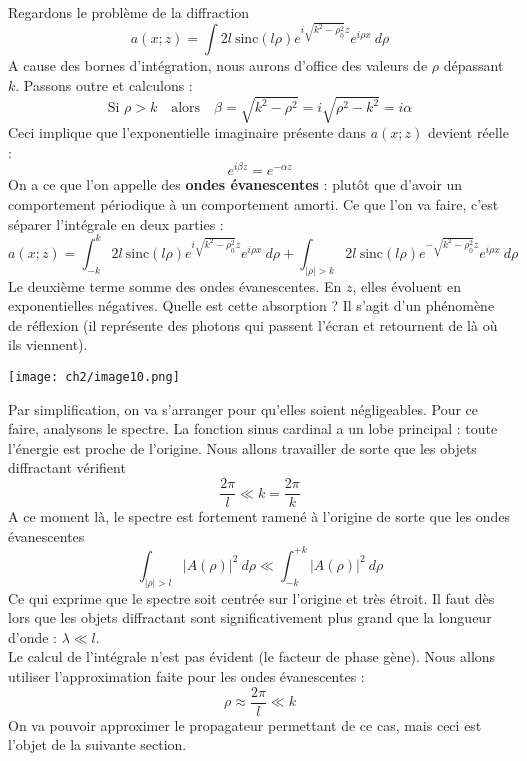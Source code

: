 \begin{enumerate}
Regardons le problème de la diffraction
\begin{equation}
a(x;z) = \int 2l\ \text{sinc}(l\rho)e^{i\sqrt{k^2-\rho_0^2}z}e^{i\rho x}\ d\rho
\end{equation}
A cause des bornes d'intégration, nous aurons d'office des valeurs de $\rho$ dépassant 
$k$. Passons outre et calculons :
\begin{equation}
\text{Si } \rho > k\quad \text{alors}\quad \beta = \sqrt{k^2-\rho^2} = i\sqrt{\rho^2-k^2} = 
i\alpha
\end{equation}
Ceci implique que l'exponentielle imaginaire présente dans $a(x;z)$ devient réelle :
\begin{equation}
e^{i\beta z} = e^{-\alpha z}
\end{equation}
On a ce que l'on appelle des \textbf{ondes évanescentes} : plutôt que d'avoir un comportement 
périodique à un comportement amorti. Ce que l'on va faire, c'est séparer l’intégrale en deux 
parties :
\begin{equation}
a(x;z) = \int_{-k}^k  2l\ \text{sinc}(l\rho)e^{i\sqrt{k^2-\rho_0^2}z}e^{i\rho x}\ d\rho + 
\int_{|\rho|>k}  2l\ \text{sinc}(l\rho)e^{-\sqrt{k^2-\rho_0^2}z}e^{i\rho x}\ d\rho
\end{equation}
Le deuxième terme somme des ondes évanescentes. En $z$, elles évoluent en exponentielles 
négatives. Quelle est cette absorption ? Il s'agit d'un phénomène de réflexion (il représente 
des photons qui passent l'écran et retournent de là où ils viennent). 

\begin{center}
\texttt{[image: ch2/image10.png]}
\end{center}
Par simplification, 
on va s'arranger pour qu'elles soient négligeables. Pour ce faire, analysons le spectre. 
La fonction sinus cardinal a un lobe principal : toute l'énergie est proche de l'origine. Nous 
allons travailler de sorte que les objets diffractant vérifient
\begin{equation}
\dfrac{2\pi}{l} \ll k = \dfrac{2\pi}{k}
\end{equation}
A ce moment là, le spectre est fortement ramené à l'origine de sorte que les ondes évanescentes 
\begin{equation}
\int_{|\rho|>l} |A(\rho)|^2\ d\rho \ll \int_{-k}^{+k} |A(\rho)|^2\ d\rho
\end{equation}
Ce qui exprime que le spectre soit centrée sur l'origine et très étroit. Il faut dès lors que 
les objets diffractant sont significativement plus grand que la longueur d'onde : $\lambda \ll l$.\\

Le calcul de l'intégrale n'est pas évident (le facteur de phase gène). Nous allons utiliser 
l'approximation faite pour les ondes évanescentes :
\begin{equation}
\rho \approx \dfrac{2\pi}{l} \ll k
\end{equation}
On va pouvoir approximer le propagateur permettant de  ce cas, mais ceci est l'objet de la 
suivante section.
\end{enumerate}

